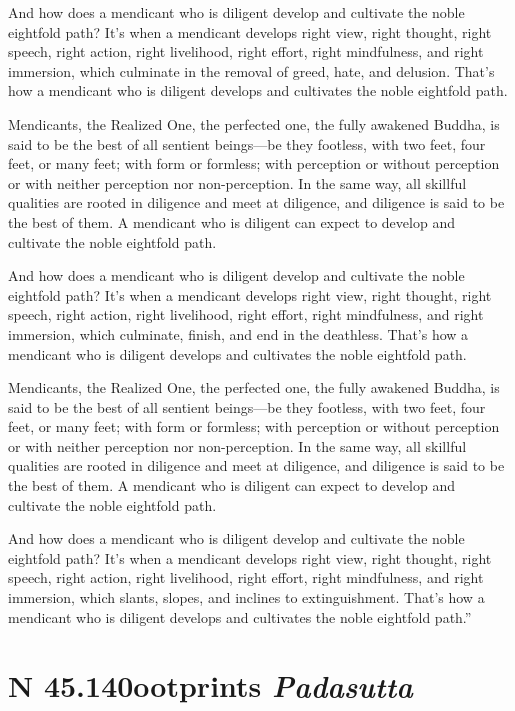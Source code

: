 \documentclass[12pt,openany]{book}%
\newcommand*{\suttatitleacronym}[1]{\smaller[2]{#1}\vspace*{.3em}}
\newcommand*{\suttatitletranslation}[1]{\linebreak{#1}}
\newcommand*{\suttatitleroot}[1]{\linebreak\smaller[2]\itshape{#1}}
\newcommand*{\tocacronym}[1]{\hspace*{-3.3em}{#1}\quad}
\newcommand*{\toctranslation}[1]{#1}
\newcommand*{\tocroot}[1]{(\textit{#1})}
\begin{document}
And how does a mendicant who is diligent develop and cultivate the noble eightfold path? It’s when a mendicant develops right view, right thought, right speech, right action, right livelihood, right effort, right mindfulness, and right immersion, which culminate in the removal of greed, hate, and delusion. That’s how a mendicant who is diligent develops and cultivates the noble eightfold path. 

Mendicants, the Realized One, the perfected one, the fully awakened Buddha, is said to be the best of all sentient beings—be they footless, with two feet, four feet, or many feet; with form or formless; with perception or without perception or with neither perception nor non-perception. In the same way, all skillful qualities are rooted in diligence and meet at diligence, and diligence is said to be the best of them. A mendicant who is diligent can expect to develop and cultivate the noble eightfold path. 

And how does a mendicant who is diligent develop and cultivate the noble eightfold path? It’s when a mendicant develops right view, right thought, right speech, right action, right livelihood, right effort, right mindfulness, and right immersion, which culminate, finish, and end in the deathless. That’s how a mendicant who is diligent develops and cultivates the noble eightfold path. 

Mendicants, the Realized One, the perfected one, the fully awakened Buddha, is said to be the best of all sentient beings—be they footless, with two feet, four feet, or many feet; with form or formless; with perception or without perception or with neither perception nor non-perception. In the same way, all skillful qualities are rooted in diligence and meet at diligence, and diligence is said to be the best of them. A mendicant who is diligent can expect to develop and cultivate the noble eightfold path. 

And how does a mendicant who is diligent develop and cultivate the noble eightfold path? It’s when a mendicant develops right view, right thought, right speech, right action, right livelihood, right effort, right mindfulness, and right immersion, which slants, slopes, and inclines to extinguishment. That’s how a mendicant who is diligent develops and cultivates the noble eightfold path.” 

%
\section*{{\suttatitleacronym SN 45.140}{\suttatitletranslation Footprints }{\suttatitleroot Padasutta}}
\addcontentsline{toc}{section}{\tocacronym{SN 45.140} \toctranslation{Footprints } \tocroot{Padasutta}}
\end{document}

